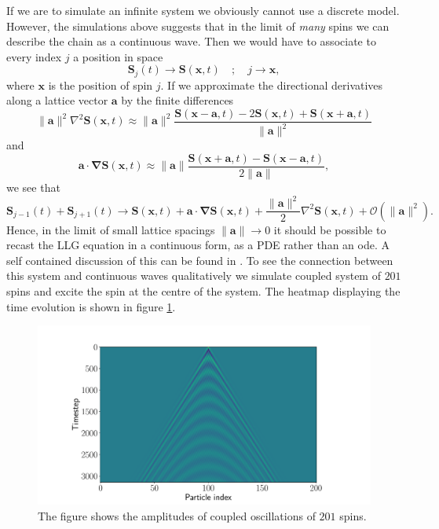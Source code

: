 \begin{remark}


If we are to simulate an infinite system we obviously cannot use a discrete model. However, the simulations above suggests that in the limit of \textit{many} spins we can describe the chain as a continuous wave. Then we would have to associate to every index $j$ a position in space 
$$
	\mathbf{S}_j(t) \to \mathbf{S}(\mathbf{x},t) \quad ; \quad j \to \mathbf{x},
$$
where $\mathbf{x}$ is the position of spin $j$.
If we approximate the directional derivatives along a lattice vector $\mathbf{a}$ by the finite differences 
$$
	 \|\mathbf{a}\|^2  \nabla^2 \mathbf{S}(\mathbf{x},t) \approx \|\mathbf{a}\|^2 \frac{\mathbf{S}(\mathbf{x} - \mathbf{a},t) - 2 \mathbf{S}(\mathbf{x},t) + \mathbf{S}(\mathbf{x} + \mathbf{a},t) }{ \| \mathbf{a} \|^2}
$$
and 
$$
	\mathbf{a} \cdot \boldsymbol{\nabla} \mathbf{S}(\mathbf{x},t) \approx \|\mathbf{a}\| \frac{\mathbf{S}(\mathbf{x}+\mathbf{a},t) - \mathbf{S}(\mathbf{x}-\mathbf{a},t)}{2\|\mathbf{a}\|},
$$
we see that 
$$
	\mathbf{S}_{j-1}(t) + \mathbf{S}_{j+1}(t) \to \mathbf{S}(\mathbf{x},t) + \mathbf{a} \cdot \boldsymbol{\nabla} \mathbf{S}(\mathbf{x},t) + \frac{\| \mathbf{a} \|^2}{2} \nabla^2 \mathbf{S}(\mathbf{x},t) + \mathcal{O}(\|\mathbf{a}\|^2).
$$
Hence, in the limit of small lattice spacings $\|\mathbf{a}\| \to 0$ it should be possible to recast the LLG equation in a continuous form, as a PDE rather than an ode. A self contained discussion of this can be found in \cite{Lakshmanan2011}. To see the connection between this system and continuous waves qualitatively we simulate coupled system of $201$ spins and excite the spin at the centre of the system. The heatmap displaying the time evolution is shown in figure \ref{fig:200_heat}.

\begin{figure}[htb]
	\centering
	\includegraphics[width=\columnwidth]{../fig/wave_200.pdf}
	\caption{The figure shows the amplitudes of coupled oscillations of $201$ spins.}
	\label{fig:200_heat}
\end{figure}

\end{remark}

